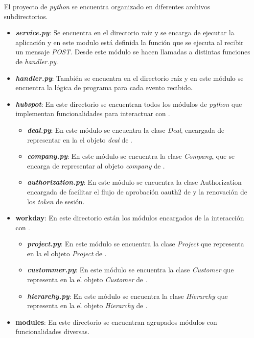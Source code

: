 El proyecto de \textit{python} se encuentra organizado en diferentes archivos subdirectorios.

\begin{itemize}

	\item [\textendash] \textbf{\textit{service.py}}: Se encuentra en el directorio raíz y se encarga de ejecutar la aplicación 
	y en este modulo está definida la función que se ejecuta al recibir un mensaje \textit{POST}. Desde este módulo se hacen llamadas a distintas funciones de \textit{handler.py}.
	\item [\textendash] \textbf{\textit{handler.py}}: También se encuentra en el directorio raíz y en este módulo se encuentra la lógica de programa para cada evento recibido.
	\item[\textendash] \textbf{\textit{hubspot}}: En este directorio se encuentran todos los módulos de \textit{python} que implementan funcionalidades para interactuar con \hs.
	
		\begin{itemize}
			\item [\textendash] \textbf{\textit{deal.py}}: En este módulo se encuentra la clase \textit{Deal}, encargada de representar en la \iface{} el objeto \textit{deal} de \hs.
			\item [\textendash] \textbf{\textit{company.py}}: En este módulo se encuentra la clase \textit{Company}, que se encarga de representar al objeto \textit{company} de \hs{}.
			\item [\textendash] \textbf{\textit{authorization.py}}: En este módulo se encuentra la clase Authorization encargada de facilitar el flujo de aprobación \gls{oauth2} de \hs{} y la renovación de los \textit{token} de sesión.
		\end{itemize}
		
	\item[\textendash] \textbf{workday}: En este directorio están los módulos encargados de la interacción con \wday.
	
		\begin{itemize}
			\item [\textendash] \textbf{\textit{project.py}}: En este módulo se encuentra la clase \textit{Project} que representa en la \iface{} el objeto \textit{Project} de \wday.
			\item [\textendash] \textbf{\textit{custommer.py}}: En este módulo se encuentra la clase \textit{Customer} que representa en la \iface{} el objeto \textit{Customer} de \wday.
			\item [\textendash] \textbf{\textit{hierarchy.py}}: En este módulo se encuentra la clase \textit{Hierarchy} que representa en la \iface{} el objeto \textit{Hierarchy} de \wday.
		\end{itemize}
	\item[\textendash] \textbf{modules}: En este directorio se encuentran agrupados módulos con funcionalidades diversas. 
	

\end{itemize}
